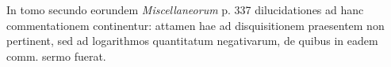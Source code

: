 \expandafter\def\csname HistoricalNoteText7\endcsname{In tomo secundo eorundem \textit{Miscellaneorum} p. 337 dilucidationes ad hanc commentationem continentur:
attamen hae ad disquisitionem praesentem non pertinent, sed ad logarithmos quantitatum negativarum,
de quibus in eadem comm. sermo fuerat.}

